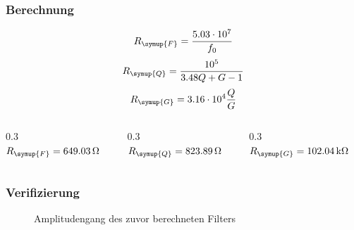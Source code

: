 \documentclass[aspectratio=169]{beamer}
\begin{document}
\begin{frame}
    \frametitle{Berechnung~\cite{horowitz_art_2015}}
    \begin{equation}
        R_{\symup{F}} = \frac{\num{5.03}\cdot 10^7}{f_0} 
    \end{equation}
    \begin{equation}
        R_{\symup{Q}} = \frac{10^5}{\num{3.48}Q + G - 1}
    \end{equation}
    \begin{equation}
        R_{\symup{G}} = \num{3.16}\cdot 10^4 \frac{Q}{G}
    \end{equation}
    \begin{columns}
        \centering
        \begin{column}{0.3\textwidth}
            \centering
            \(R_{\symup{F}} = \qty{649.03}{\ohm}\)
        \end{column}
        \begin{column}{0.3\textwidth}
            \centering
            \(R_{\symup{Q}} = \qty{823.89}{\ohm}\)
        \end{column}
        \begin{column}{0.3\textwidth}
            \centering
            \(R_{\symup{G}} = \qty{102.04}{\kilo\ohm}\)
        \end{column}
    \end{columns}
\end{frame}
\begin{frame}
    \frametitle{Verifizierung}
    \begin{figure}
  \centering
  \caption{Amplitudengang des zuvor berechneten Filters}
  \label{fig:amplitudengang}
\end{figure}
\end{frame}
\end{document}

